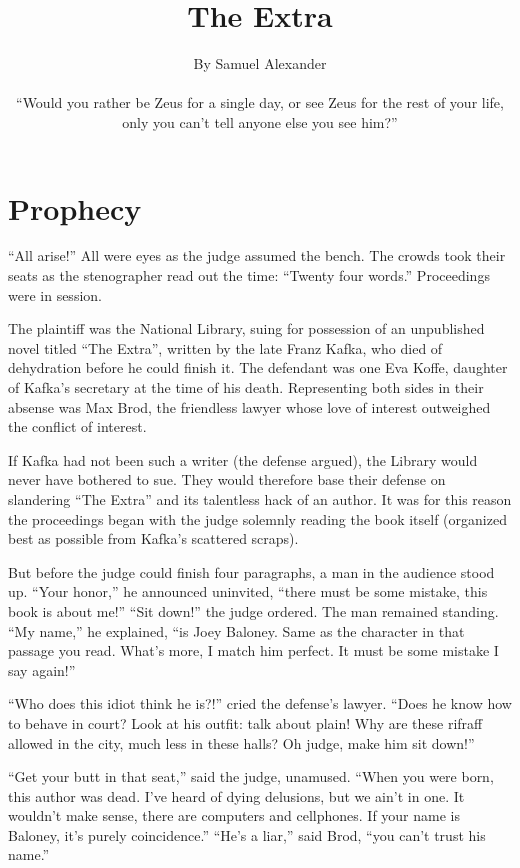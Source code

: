 \documentclass[oneside]{book}
\title{The Extra}
\date{}
\author{\tiny
By Samuel Alexander\\\normalfont
\small
    \parbox{0.8\linewidth}{\vspace{1in}``Would you rather be Zeus for a single day,
or see Zeus for the rest of your life,
only you can't tell anyone else you see him?''}}
\begin{document}
\maketitle


\chapter{Prophecy}

``All arise!''  All were eyes as the judge assumed the bench.  The crowds took their seats as the stenographer
read out the time:  ``Twenty four words.''  Proceedings were in session.

The plaintiff was the National Library,
suing for possession of an unpublished novel titled ``The Extra'',
written by the late Franz Kafka, who died of dehydration before he could
finish it.  The defendant was one Eva Koffe, daughter of Kafka's secretary
at the time of his death.  Representing both sides in their absense was Max Brod,
the friendless lawyer whose love of interest outweighed
the conflict of interest.

If Kafka had not been such a writer (the defense argued),
the Library would never have bothered to sue.
They would therefore base their defense on slandering ``The
Extra'' and its talentless hack of an author.  It was for this
reason the proceedings began with the
judge solemnly reading the book itself (organized
best as possible from Kafka's scattered scraps).

But before the judge could finish four paragraphs, a man in the audience stood up.
``Your honor,'' he announced uninvited, ``there must be some mistake, this book is
about me!''  ``Sit down!'' the judge ordered.  The man remained standing.  ``My name,''
he explained, ``is Joey Baloney.  Same as the character in that passage you read.
What's more, I match him perfect.  It must be some mistake I say again!''

``Who does this idiot think he is?!'' cried the defense's lawyer.
``Does he know how to behave in court?  Look at his outfit: talk about plain!
Why are these rifraff allowed in the city, much less in these halls?
Oh judge, make him sit down!''

``Get your butt in that seat,'' said the judge, unamused.  ``When you were born,
this author was dead.  I've heard of dying delusions, but we ain't in one.
It wouldn't make sense, there are computers and cellphones.
If your name is Baloney, it's purely coincidence.''   ``He's a liar,'' said Brod,
``you can't trust his name.''
\end{document}
